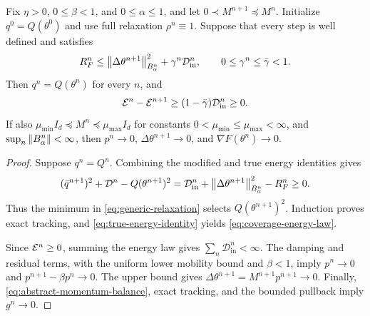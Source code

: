 \begin{theorem}
\label{thm:coverage-full-relaxation}
Fix \(\eta>0\), \(0\leq\beta<1\), and \(0\leq\alpha\leq1\), and
let \(0\prec M^{n+1}\preceq M^n\). Initialize \(q^0=Q(\theta^0)\)
and use full relaxation \(\rho^n\equiv1\). Suppose that every step is
well defined and satisfies
\begin{equation}
  R_F^n\leq\left\lVert\Delta\theta^{n+1}\right\rVert_{B_\alpha^n}^2
          +\gamma^n\mathcal D_{\mathrm{in}}^n,
  \qquad 0\leq\gamma^n\leq\bar\gamma<1.
  \label{eq:directional-coverage-condition}
\end{equation}
Then \(q^n=Q(\theta^n)\) for every \(n\), and
\begin{equation}
  \mathcal{E}^n-\mathcal{E}^{n+1}\geq(1-\bar\gamma)\mathcal D_{\mathrm{in}}^n\geq0.
  \label{eq:coverage-energy-law}
\end{equation}
If also \(\mu_{\min} I_d\preceq M^n\preceq\mu_{\max} I_d\) for
constants \(0<\mu_{\min}\leq\mu_{\max}<\infty\), and
\(\sup_n\left\lVert B_\alpha^n\right\rVert<\infty\), then
\(p^n\to0\), \(\Delta\theta^{n+1}\to0\), and
\(\nabla F(\theta^n)\to0\).
\end{theorem}

\begin{proof}
Suppose \(q^n=Q^n\). Combining the modified and true energy identities
gives
\begin{equation}
  (\bar q^{n+1})^2+\mathcal D^n-Q(\theta^{n+1})^2
  =\mathcal D_{\mathrm{in}}^n
   +\left\lVert\Delta\theta^{n+1}\right\rVert_{B_\alpha^n}^2-R_F^n\geq0.
  \label{eq:coverage-scalar-budget}
\end{equation}
Thus the minimum in \cref{eq:generic-relaxation} selects
\(Q(\theta^{n+1})^2\). Induction proves exact tracking, and
\cref{eq:true-energy-identity} yields \cref{eq:coverage-energy-law}.

Since \(\mathcal{E}^n\geq0\), summing the energy law gives
\(\sum_n\mathcal D_{\mathrm{in}}^n<\infty\). The damping and residual
terms, with the uniform lower mobility bound and \(\beta<1\), imply
\(p^n\to0\) and \(p^{n+1}-\beta p^n\to0\). The upper bound gives
\(\Delta\theta^{n+1}=M^{n+1}p^{n+1}\to0\). Finally,
\cref{eq:abstract-momentum-balance}, exact tracking, and the bounded
pullback imply \(g^n\to0\).
\end{proof}

